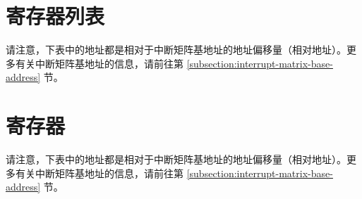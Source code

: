 \documentclass[main\_\_CN.tex]{subfiles}
\begin{document}
\hypertarget{intmtrx-reg-summ}{}
\section{寄存器列表}

请注意，下表中的地址都是相对于中断矩阵基地址的地址偏移量（相对地址）。更多有关中断矩阵基地址的信息，请前往第 \ref{subsection:interrupt-matrix-base-address} 节。
\clearpage

\begin{landscape}


\end{landscape}
\restoregeometry

\section{寄存器}
请注意，下表中的地址都是相对于中断矩阵基地址的地址偏移量（相对地址）。更多有关中断矩阵基地址的信息，请前往第 \ref{subsection:interrupt-matrix-base-address} 节。

\end{document}
